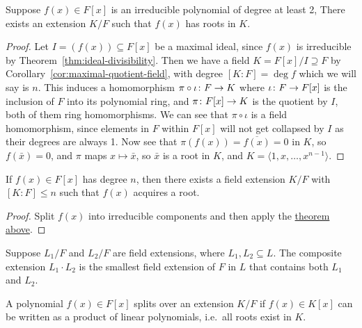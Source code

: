 \begin{theorem}\label{thm:field-extension-gain-root}
    Suppose \(f(x) \in F[x]\) is an irreducible polynomial of degree at least 2,
    There exists an extension \(K/F\) such that \(f(x)\) has roots in \(K\).
\end{theorem}
\begin{proof}
    Let \(I = (f(x)) \subseteq F[x]\) be a maximal ideal,
    since \(f(x)\) is irreducible by Theorem~\ref{thm:ideal-divisibility}.
    Then we have a field \(K = F[x]/I \supseteq F\)
    by Corollary~\ref{cor:maximal-quotient-field},
    with degree \([K:F] = \deg f\) which we will say is \(n\).
    This induces a homomorphism \(\pi\circ\iota\colon F\to K\)
    where \(\iota\colon F\to F[x]\) is the inclusion of \(F\) into its polynomial ring,
    and \(\pi\colon F[x]\to K\) is the quotient by \(I\),
    both of them ring homomorphisms.
    We can see that \(\pi\circ\iota\) is a field homomorphism,
    since elements in \(F\) within \(F[x]\) will not get collapsed by \(I\)
    as their degrees are always 1.
    Now see that \(\pi(f(x)) = \overline{f(x)} = 0\) in \(K\),
    so \(f(\bar{x}) = 0\), and \(\pi\) maps \(x \mapsto \bar{x}\),
    so \(\bar{x}\) is a root in \(K\),
    and \(K = \langle 1, x, \hdots, x^{n-1} \rangle\).
\end{proof}
\begin{corollary}
    If \(f(x) \in F[x]\) has degree \(n\),
    then there exists a field extension \(K/F\)
    with \([K:F] \leq n\) such that \(f(x)\) acquires a root.
\end{corollary}
\begin{proof}
    Split \(f(x)\) into irreducible components
    and then apply the \hyperref[thm:field-extension-gain-root]{theorem above}.
\end{proof}

\begin{definition}
    Suppose \(L_1/F\) and \(L_2/F\) are field extensions,
    where \(L_1,L_2 \subseteq L\).
    The composite extension \(L_1 \cdot L_2\)
    is the smallest field extension of \(F\) in \(L\)
    that contains both \(L_1\) and \(L_2\).
\end{definition}

\begin{definition}
    A polynomial \(f(x) \in F[x]\) splits over an extension \(K/F\)
    if \(f(x) \in K[x]\) can be written as a product of linear polynomials,
    i.e.\ all roots exist in \(K\).
\end{definition}

